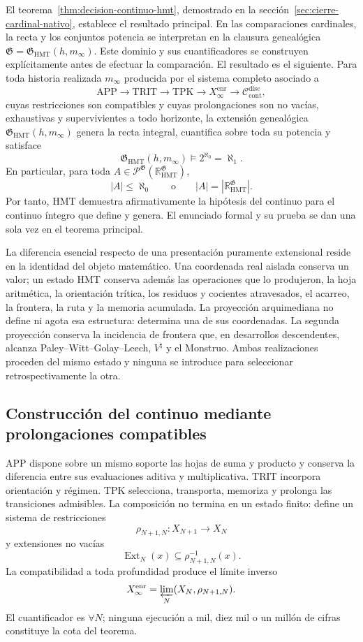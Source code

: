 El teorema~\ref{thm:decision-continuo-hmt}, demostrado en la
sección~\ref{sec:cierre-cardinal-nativo}, establece el resultado principal.
En las comparaciones cardinales, la recta y los conjuntos potencia se
interpretan en la clausura genealógica
\(\mathfrak G=\mathfrak G_{\mathrm{HMT}}(h,m_\infty)\). Este dominio y sus
cuantificadores se construyen explícitamente antes de efectuar la comparación.
El resultado es el siguiente. Para toda historia realizada \(m_\infty\)
producida por el sistema completo asociado a
\[
 \mathrm{APP}\longrightarrow\mathrm{TRIT}\longrightarrow\mathrm{TPK}
 \longrightarrow X_\infty^{\mathrm{enr}}
 \longrightarrow\mathcal C_{\mathrm{cont}}^{\mathrm{disc}},
\]
cuyas restricciones son compatibles y cuyas prolongaciones son no vacías,
exhaustivas y supervivientes a todo horizonte, la extensión genealógica
\(\mathfrak G_{\mathrm{HMT}}(h,m_\infty)\) genera la recta integral,
cuantifica sobre toda su potencia y satisface
\[
 \mathfrak G_{\mathrm{HMT}}(h,m_\infty)
 \models 2^{\aleph_0}=\aleph_1.
\]
En particular, para toda
\(A\in\mathcal P^{\mathfrak G}(\mathbb R_{\mathrm{HMT}}^{\mathfrak G})\),
\[
 |A|\leq\aleph_0
 \qquad\text{o}\qquad
 |A|=|\mathbb R_{\mathrm{HMT}}^{\mathfrak G}|.
\]
Por tanto, HMT demuestra afirmativamente la hipótesis del continuo para el
continuo íntegro que define y genera. El enunciado formal y su prueba se dan
una sola vez en el teorema principal.

La diferencia esencial respecto de una presentación puramente extensional
reside en la identidad del objeto matemático. Una coordenada real aislada
conserva un valor; un estado HMT conserva además las operaciones que lo
produjeron, la hoja aritmética, la orientación trítica, los residuos y
cocientes atravesados, el acarreo, la frontera, la ruta y la memoria acumulada.
La proyección arquimediana no define ni agota esa estructura: determina una de
sus coordenadas. La segunda proyección conserva la incidencia de frontera que,
en desarrollos descendentes, alcanza Paley--Witt--Golay--Leech,
\(V^\natural\) y el Monstruo. Ambas realizaciones proceden del mismo estado y
ninguna se introduce para seleccionar retrospectivamente la otra.

\subsection{Construcción del continuo mediante prolongaciones compatibles}

APP dispone sobre un mismo soporte las hojas de suma y producto y conserva la
diferencia entre sus evaluaciones aditiva y multiplicativa. TRIT incorpora orientación y régimen. TPK
selecciona, transporta, memoriza y prolonga las transiciones admisibles. La
composición no termina en un estado finito: define un sistema de restricciones
\[
 \rho_{N+1,N}:X_{N+1}\longrightarrow X_N
\]
y extensiones no vacías
\[
 \operatorname{Ext}_N(x)\subseteq\rho_{N+1,N}^{-1}(x).
\]
La compatibilidad a toda profundidad produce el límite inverso
\[
 X_\infty^{\mathrm{enr}}
 =\varprojlim_N(X_N,\rho_{N+1,N}).
\]
El cuantificador es \(\forall N\); ninguna ejecución a mil, diez mil o un
millón de cifras constituye la cota del teorema.

